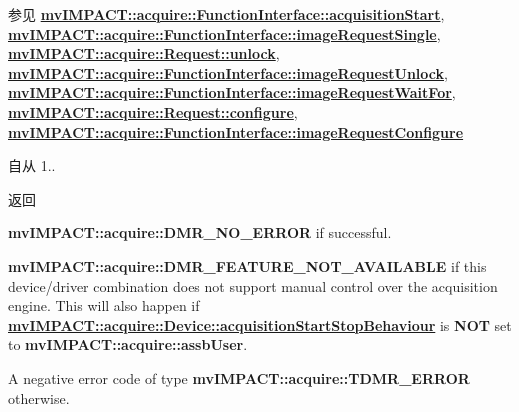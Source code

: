 \begin{DoxySeeAlso}{参见}
{\bfseries \hyperlink{classmv_i_m_p_a_c_t_1_1acquire_1_1_function_interface_a91750ec88416ca6557b1bbb10ebc5039}{mv\+I\+M\+P\+A\+C\+T\+::acquire\+::\+Function\+Interface\+::acquisition\+Start}}, ~\newline
 {\bfseries \hyperlink{classmv_i_m_p_a_c_t_1_1acquire_1_1_function_interface_a59571120b5e81c3af596ea5da5dc63ba}{mv\+I\+M\+P\+A\+C\+T\+::acquire\+::\+Function\+Interface\+::image\+Request\+Single}}, ~\newline
 {\bfseries \hyperlink{classmv_i_m_p_a_c_t_1_1acquire_1_1_request_a3c30ced407d20caef49e3148257cd91e}{mv\+I\+M\+P\+A\+C\+T\+::acquire\+::\+Request\+::unlock}}, ~\newline
 {\bfseries \hyperlink{classmv_i_m_p_a_c_t_1_1acquire_1_1_function_interface_a378a338217d5a681e880a0d9395f1a62}{mv\+I\+M\+P\+A\+C\+T\+::acquire\+::\+Function\+Interface\+::image\+Request\+Unlock}}, ~\newline
 {\bfseries \hyperlink{classmv_i_m_p_a_c_t_1_1acquire_1_1_function_interface_a4cefdfda8e8940736ae9a4c97b6de8c9}{mv\+I\+M\+P\+A\+C\+T\+::acquire\+::\+Function\+Interface\+::image\+Request\+Wait\+For}}, ~\newline
 {\bfseries \hyperlink{classmv_i_m_p_a_c_t_1_1acquire_1_1_request_a5ad02aed16acd60699f3d8757c63af43}{mv\+I\+M\+P\+A\+C\+T\+::acquire\+::\+Request\+::configure}}, ~\newline
 {\bfseries \hyperlink{classmv_i_m_p_a_c_t_1_1acquire_1_1_function_interface_a05594ac5b54679152d27ac0e73b3908e}{mv\+I\+M\+P\+A\+C\+T\+::acquire\+::\+Function\+Interface\+::image\+Request\+Configure}} 
\end{DoxySeeAlso}
\begin{DoxySince}{自从}
1..
\end{DoxySince}
\begin{DoxyReturn}{返回}

\begin{DoxyItemize}
\item {\bfseries mv\+I\+M\+P\+A\+C\+T\+::acquire\+::\+D\+M\+R\+\_\+\+N\+O\+\_\+\+E\+R\+R\+O\+R} if successful.
\item {\bfseries mv\+I\+M\+P\+A\+C\+T\+::acquire\+::\+D\+M\+R\+\_\+\+F\+E\+A\+T\+U\+R\+E\+\_\+\+N\+O\+T\+\_\+\+A\+V\+A\+I\+L\+A\+B\+L\+E} if this device/driver combination does not support manual control over the acquisition engine. This will also happen if {\bfseries \hyperlink{classmv_i_m_p_a_c_t_1_1acquire_1_1_device_aa5cdb4615de973bbf1c24f2fd5a3d1b5}{mv\+I\+M\+P\+A\+C\+T\+::acquire\+::\+Device\+::acquisition\+Start\+Stop\+Behaviour}} is {\bfseries N\+O\+T} set to {\bfseries mv\+I\+M\+P\+A\+C\+T\+::acquire\+::assb\+User}.
\item A negative error code of type {\bfseries mv\+I\+M\+P\+A\+C\+T\+::acquire\+::\+T\+D\+M\+R\+\_\+\+E\+R\+R\+O\+R} otherwise. 
\end{DoxyItemize}
\end{DoxyReturn}
